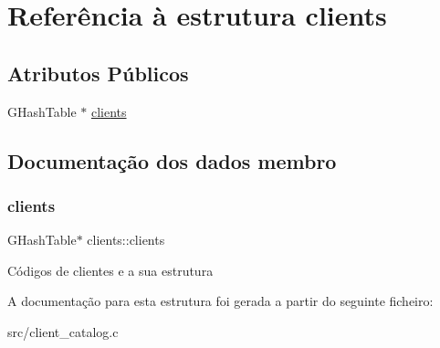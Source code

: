\hypertarget{structclients}{}\section{Referência à estrutura clients}
\label{structclients}
\subsection*{Atributos Públicos}
\begin{DoxyCompactItemize}
\item 
G\+Hash\+Table $\ast$ \hyperlink{structclients_a15abe7567353cf5edb21e92d4b04f7f3}{clients}
\end{DoxyCompactItemize}


\subsection{Documentação dos dados membro}
\mbox{\label{structclients_a15abe7567353cf5edb21e92d4b04f7f3}} 
\subsubsection{\texorpdfstring{clients}{clients}}
{\footnotesize\ttfamily G\+Hash\+Table$\ast$ clients\+::clients}

Códigos de clientes e a sua estrutura 

A documentação para esta estrutura foi gerada a partir do seguinte ficheiro\+:\begin{DoxyCompactItemize}
\item 
src/client\+\_\+catalog.\+c\end{DoxyCompactItemize}
